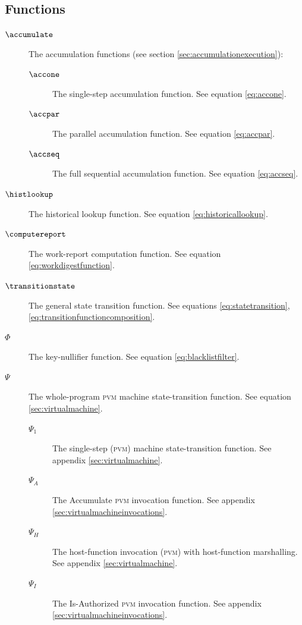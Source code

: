 \subsection{Functions}

\begin{description}
  \item[$\accumulate$] The accumulation functions (see section \ref{sec:accumulationexecution}):
  \begin{description}
    \item[$\accone$] The single-step accumulation function. See equation \ref{eq:accone}.
    \item[$\accpar$] The parallel accumulation function. See equation \ref{eq:accpar}.
    \item[$\accseq$] The full sequential accumulation function. See equation \ref{eq:accseq}.
  \end{description}
  \item[$\histlookup$] The historical lookup function. See equation \ref{eq:historicallookup}.
  \item[$\computereport$] The work-report computation function. See equation \ref{eq:workdigestfunction}.
  \item[$\transitionstate$] The general state transition function. See equations \ref{eq:statetransition}, \ref{eq:transitionfunctioncomposition}.
  \item[$\Phi$] The key-nullifier function. See equation \ref{eq:blacklistfilter}.
  \item[$\Psi$] The whole-program \textsc{pvm} machine state-transition function. See equation \ref{sec:virtualmachine}.
  \begin{description}
    \item[$\Psi_1$] The single-step (\textsc{pvm}) machine state-transition function. See appendix \ref{sec:virtualmachine}.
    \item[$\Psi_A$] The Accumulate \textsc{pvm} invocation function. See appendix \ref{sec:virtualmachineinvocations}.
    \item[$\Psi_H$] The host-function invocation (\textsc{pvm}) with host-function marshalling. See appendix \ref{sec:virtualmachine}.
    \item[$\Psi_I$] The Is-Authorized \textsc{pvm} invocation function. See appendix \ref{sec:virtualmachineinvocations}.

\end{description}
\end{description}
